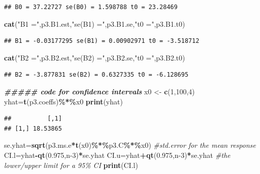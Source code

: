 \documentclass[
]{article}
\newenvironment{Shaded}{\begin{snugshade}}{\end{snugshade}}
\newcommand{\CommentTok}[1]{\textcolor[rgb]{0.56,0.35,0.01}{\textit{#1}}}
\newcommand{\DecValTok}[1]{\textcolor[rgb]{0.00,0.00,0.81}{#1}}
\newcommand{\DocumentationTok}[1]{\textcolor[rgb]{0.56,0.35,0.01}{\textbf{\textit{#1}}}}
\newcommand{\FloatTok}[1]{\textcolor[rgb]{0.00,0.00,0.81}{#1}}
\newcommand{\FunctionTok}[1]{\textcolor[rgb]{0.13,0.29,0.53}{\textbf{#1}}}
\newcommand{\NormalTok}[1]{#1}
\newcommand{\OtherTok}[1]{\textcolor[rgb]{0.56,0.35,0.01}{#1}}
\newcommand{\SpecialCharTok}[1]{\textcolor[rgb]{0.81,0.36,0.00}{\textbf{#1}}}
\newcommand{\StringTok}[1]{\textcolor[rgb]{0.31,0.60,0.02}{#1}}
\begin{document}
\begin{verbatim}
## B0 = 37.22727 se(B0) = 1.598788 t0 = 23.28469
\end{verbatim}

\begin{Shaded}
\begin{Highlighting}[]
\FunctionTok{cat}\NormalTok{(}\StringTok{"B1 ="}\NormalTok{,p3.B1.est,}\StringTok{"se(B1) ="}\NormalTok{,p3.B1.se,}\StringTok{"t0 ="}\NormalTok{,p3.B1.t0)}
\end{Highlighting}
\end{Shaded}

\begin{verbatim}
## B1 = -0.03177295 se(B1) = 0.00902971 t0 = -3.518712
\end{verbatim}

\begin{Shaded}
\begin{Highlighting}[]
\FunctionTok{cat}\NormalTok{(}\StringTok{"B2 ="}\NormalTok{,p3.B2.est,}\StringTok{"se(B2) ="}\NormalTok{,p3.B2.se,}\StringTok{"t0 ="}\NormalTok{,p3.B2.t0)}
\end{Highlighting}
\end{Shaded}

\begin{verbatim}
## B2 = -3.877831 se(B2) = 0.6327335 t0 = -6.128695
\end{verbatim}

\begin{Shaded}
\begin{Highlighting}[]
\DocumentationTok{\#\#\#\#\# code for confidence intervals}
\NormalTok{x0 }\OtherTok{\textless{}{-}} \FunctionTok{c}\NormalTok{(}\DecValTok{1}\NormalTok{,}\DecValTok{100}\NormalTok{,}\DecValTok{4}\NormalTok{)}
\NormalTok{yhat}\OtherTok{=}\FunctionTok{t}\NormalTok{(p3.coeffs)}\SpecialCharTok{\%*\%}\NormalTok{x0}
\FunctionTok{print}\NormalTok{(yhat)}
\end{Highlighting}
\end{Shaded}

\begin{verbatim}
##          [,1]
## [1,] 18.53865
\end{verbatim}

\begin{Shaded}
\begin{Highlighting}[]
\NormalTok{se.yhat}\OtherTok{=}\FunctionTok{sqrt}\NormalTok{(p3.ms.e}\SpecialCharTok{*}\FunctionTok{t}\NormalTok{(x0)}\SpecialCharTok{\%*\%}\NormalTok{p3.C}\SpecialCharTok{\%*\%}\NormalTok{x0)     }\CommentTok{\#std.error for the mean response}
\NormalTok{CI.l}\OtherTok{=}\NormalTok{yhat}\SpecialCharTok{{-}}\FunctionTok{qt}\NormalTok{(}\FloatTok{0.975}\NormalTok{,n}\DecValTok{{-}3}\NormalTok{)}\SpecialCharTok{*}\NormalTok{se.yhat}
\NormalTok{CI.u}\OtherTok{=}\NormalTok{yhat}\SpecialCharTok{+}\FunctionTok{qt}\NormalTok{(}\FloatTok{0.975}\NormalTok{,n}\DecValTok{{-}3}\NormalTok{)}\SpecialCharTok{*}\NormalTok{se.yhat     }\CommentTok{\#the lower/upper limit for a 95\% CI}
\FunctionTok{print}\NormalTok{(CI.l)}
\end{Highlighting}
\end{Shaded}
\end{document}
